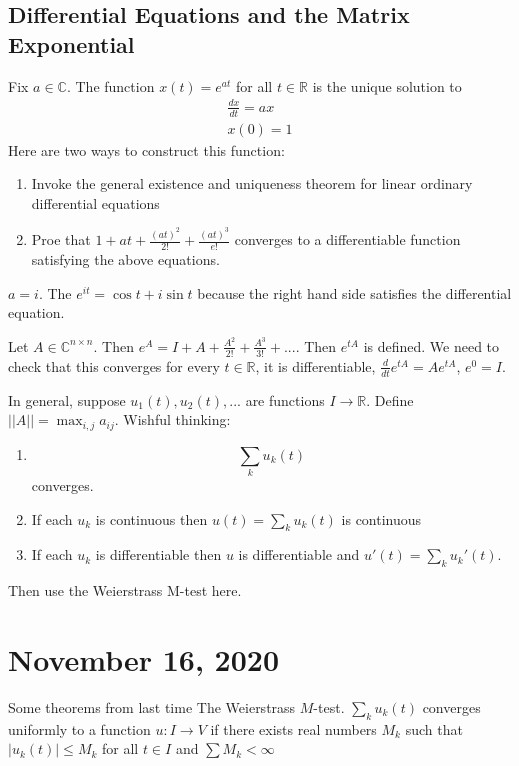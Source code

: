 \documentclass{article}
\newcommand{\C}{\mathbb{C}}
\newcommand{\R}{\mathbb{R}}
\newcommand{\ra}[1][]{\xrightarrow{#1}}
\begin{document}
\subsection{Differential Equations and the Matrix Exponential}
Fix $a\in\C$. The function $x(t)=e^{at}$ for all $t\in\R$ is the unique solution to 
\begin{equation*}
    \begin{split}
        \frac{dx}{dt}=ax\\
        x(0)=1
    \end{split}
\end{equation*}
Here are two ways to construct this function:
\begin{enumerate}
    \item Invoke the general existence and uniqueness theorem for linear ordinary differential equations
    \item Proe that $1+at+\frac{(at)^2}{2!}+\frac{(at)^3}{e!}$ converges to a differentiable function satisfying the above equations.
\end{enumerate}
\begin{example}
$a=i$. The $e^{it}=\cos t+i\sin t$ because the right hand side satisfies the differential equation.
\end{example}
\begin{definition}
Let $A\in\C^{n\times n}$. Then $e^A=I+A+\frac{A^2}{2!}+\frac{A^3}{3!}+...$. Then $e^{tA}$ is defined. We need to check that this converges for every $t\in\R$, it is differentiable, $\frac{d}{dt}e^{tA}=Ae^{tA}$, $e^0=I$.
\end{definition}
In general, suppose $u_1(t),u_2(t),...$ are functions $I\ra \R$. Define $||A||=\max_{i,j} a_{ij}$.
Wishful thinking:
\begin{enumerate}
    \item $$\sum_k u_k(t)$$ converges.
    \item If each $u_k$ is continuous then $u(t)=\sum_k u_k(t)$ is continuous
    \item If each $u_k$ is differentiable then $u$ is differentiable and $u'(t)=\sum_k u_k'(t)$.
\end{enumerate}
Then use the Weierstrass M-test here.
\section{November 16, 2020}
Some theorems from last time
The Weierstrass $M$-test. $\sum_k u_k(t)$ converges uniformly to a function $u:I\ra V$ if there exists real numbers $M_k$ such that $|u_k(t)|\leq M_k$ for all $t\in I$ and $\sum M_k<\infty$
\end{document}
